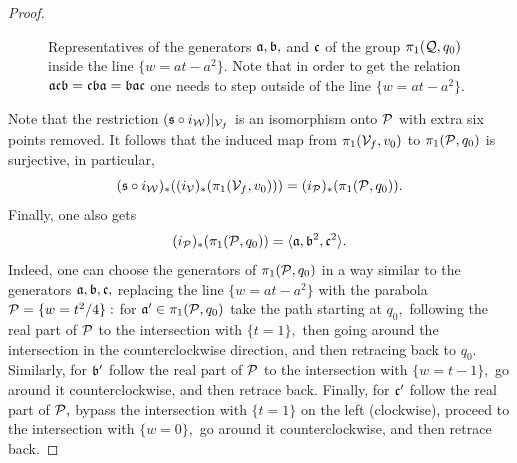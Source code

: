 \documentclass{article}
\begin{document}
\begin{proof}
\begin{figure}
\begin{center}
\end{center}
\caption{Representatives of the generators $\mathfrak{a},\mathfrak{b},$ and $\mathfrak{c}$ of the group $\pi_1(\mathcal{Q},q_0)$ inside the line $\{w=at-a^2\}.$ Note that in order to get the relation $\mathfrak{a}\mathfrak{c}\mathfrak{b}=\mathfrak{c}\mathfrak{b}\mathfrak{a}=\mathfrak{b}\mathfrak{a}\mathfrak{c}$ one needs to step outside of the line $\{w=at-a^2\}$.}\label{fig: a,b,c}
\end{figure}

Note that the restriction $(\mathfrak{s}\circ i_{\mathcal{W}})|_{\mathcal{V}_f}$ is an isomorphism onto $\mathcal{P}$ with extra six points removed. It follows that the induced map from $\pi_1(\mathcal{V}_f,v_0)$ to $\pi_1(\mathcal{P},q_0)$ is surjective, in particular, 
$$
(\mathfrak{s}\circ i_{\mathcal{W}})_*((i_{\mathcal{V}})_*(\pi_1(\mathcal{V}_f,v_0)))=(i_{\mathcal{P}})_*(\pi_1(\mathcal{P},q_0)).
$$
Finally, one also gets
$$
(i_{\mathcal{P}})_*(\pi_1(\mathcal{P},q_0))=\langle \mathfrak{a},\mathfrak{b}^2,\mathfrak{c}^2\rangle.
$$
Indeed, one can choose the generators of $\pi_1(\mathcal{P},q_0)$ in a way similar to the generators $\mathfrak{a},\mathfrak{b},\mathfrak{c},$ replacing the line $\{w=at-a^2\}$ with the parabola $\mathcal{P}=\{w=t^2/4\}:$ for $\mathfrak{a}'\in\pi_1(\mathcal{P},q_0)$ take the path starting at $q_0,$ following the real part of $\mathcal{P}$ to the intersection with $\{t=1\},$ then going around the intersection in the counterclockwise direction, and then retracing back to $q_0.$ Similarly, for $\mathfrak{b}'$ follow the real part of $\mathcal{P}$ to the intersection with $\{w=t-1\},$ go around it counterclockwise, and then retrace back. Finally, for $\mathfrak{c}'$ follow the real part of $\mathcal{P},$ bypass the intersection with $\{t=1\}$ on the left (clockwise), proceed to the intersection with $\{w=0\},$ go around it counterclockwise, and then retrace back. 


\end{proof}
\end{document}
